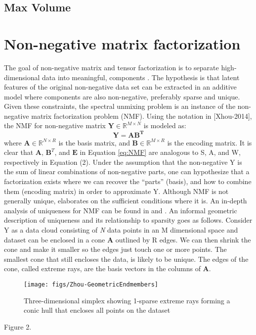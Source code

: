 \subsection{Max Volume}
\section{Non-negative matrix factorization}
The goal of non-negative matrix and tensor factorization is to separate high-dimensional data into meaningful, components \cite{lee_algorithms_2000}.  The hypothesis is that latent features of the original non-negative data set can be extracted in an additive model where components are also non-negative, preferably sparse and unique.  Given these constraints, the spectral unmixing problem is an instance of the non-negative matrix factorization problem (NMF).  Using the notation in [Xhou-2014], the NMF for non-negative matrix $\mathbf{Y} \in \mathbb{R}^{M \times N}$ is modeled as:
\begin{equation}\label{eq:NMF}
	\mathbf{Y = AB^T}
\end{equation}
where $\mathbf{A} \in \mathbb{R}^{N\times R}$
is the basis matrix, and 
$\mathbf{B} \in \mathbb{R}^{M\times R}$ 
is the encoding matrix.  It is clear that \textbf{A}, $\mathbf{B}^T$, and $\mathbf{E}$ in Equation \eqref{eq:NMF} are analogous to S, A, and W, respectively in Equation (2).  Under the assumption that the non-negative Y is the sum of linear combinations of non-negative parts, one can hypothesize that a factorization exists where we can recover the “parts” (basis), and how to combine them (encoding matrix) in order to approximate Y.
Although NMF is not generally unique, \cite{donoho_when_2004} elaborates on the sufficient conditions where it is.  An in-depth analysis of uniqueness for NMF can be found in \cite{sidiropoulos_} and \cite{huang_non-negative_2014}.  An informal geometric description of uniqueness and its relationship to sparsity goes as follows.  Consider Y as a data cloud consisting of \textit{N} data points in an M dimensional space and dataset can be enclosed in a cone \textbf{A} outlined by R edges.  We can then shrink the cone and make it smaller so the edges just touch one or more points.  The smallest cone that still encloses the data, is likely to be unique.  The edges of the cone, called extreme rays, are the basis vectors in the columns of \textbf{A}.  
\begin{figure}[ht]
	\begin{center}
		\texttt{[image: figs/Zhou-GeometricEndmembers]}
		\caption{Three-dimensional simplex showing 1-sparse extreme rays forming a conic hull that encloses all points on the dataset \cite{zhou_nonnegative_2014}}
		\label{fig:Zhou-GeometricEndmembers}
	\end{center}
\end{figure}
Figure 2. 


